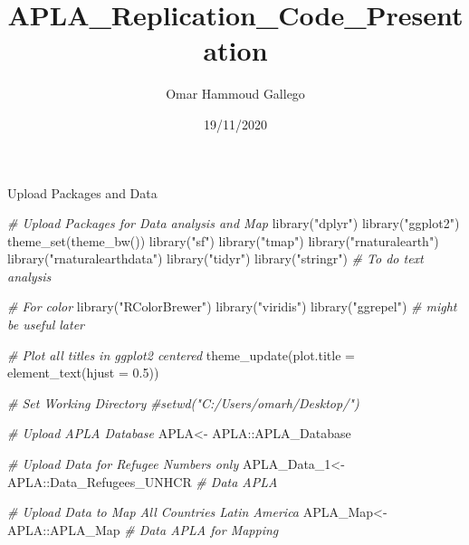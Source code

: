 \documentclass[
  ignorenonframetext,
]{beamer}
\title{APLA\_Replication\_Code\_Presentation}
\author{Omar Hammoud Gallego}
\date{19/11/2020}
\newenvironment{Shaded}{\begin{snugshade}}{\end{snugshade}}
\newcommand{\AttributeTok}[1]{\textcolor[rgb]{0.77,0.63,0.00}{#1}}
\newcommand{\CommentTok}[1]{\textcolor[rgb]{0.56,0.35,0.01}{\textit{#1}}}
\newcommand{\FloatTok}[1]{\textcolor[rgb]{0.00,0.00,0.81}{#1}}
\newcommand{\FunctionTok}[1]{\textcolor[rgb]{0.00,0.00,0.00}{#1}}
\newcommand{\NormalTok}[1]{#1}
\newcommand{\OtherTok}[1]{\textcolor[rgb]{0.56,0.35,0.01}{#1}}
\newcommand{\SpecialCharTok}[1]{\textcolor[rgb]{0.00,0.00,0.00}{#1}}
\newcommand{\StringTok}[1]{\textcolor[rgb]{0.31,0.60,0.02}{#1}}
\begin{document}
\frame{\titlepage}

\begin{frame}[fragile]{Upload Packages and Data}
\protect\hypertarget{upload-packages-and-data}{}
\begin{Shaded}
\begin{Highlighting}[]
\CommentTok{\# Upload Packages for Data analysis and Map}
\FunctionTok{library}\NormalTok{(}\StringTok{"dplyr"}\NormalTok{)}
\FunctionTok{library}\NormalTok{(}\StringTok{"ggplot2"}\NormalTok{)}
\FunctionTok{theme\_set}\NormalTok{(}\FunctionTok{theme\_bw}\NormalTok{())}
\FunctionTok{library}\NormalTok{(}\StringTok{"sf"}\NormalTok{)}
\FunctionTok{library}\NormalTok{(}\StringTok{"tmap"}\NormalTok{)}
\FunctionTok{library}\NormalTok{(}\StringTok{"rnaturalearth"}\NormalTok{)}
\FunctionTok{library}\NormalTok{(}\StringTok{"rnaturalearthdata"}\NormalTok{)}
\FunctionTok{library}\NormalTok{(}\StringTok{"tidyr"}\NormalTok{)}
\FunctionTok{library}\NormalTok{(}\StringTok{"stringr"}\NormalTok{)  }\CommentTok{\# To do text analysis }

\CommentTok{\# For color}
\FunctionTok{library}\NormalTok{(}\StringTok{"RColorBrewer"}\NormalTok{)}
\FunctionTok{library}\NormalTok{(}\StringTok{"viridis"}\NormalTok{)}
\FunctionTok{library}\NormalTok{(}\StringTok{"ggrepel"}\NormalTok{) }\CommentTok{\# might be useful later}

\CommentTok{\# Plot all titles in ggplot2 centered}
\FunctionTok{theme\_update}\NormalTok{(}\AttributeTok{plot.title =} \FunctionTok{element\_text}\NormalTok{(}\AttributeTok{hjust =} \FloatTok{0.5}\NormalTok{))}
\end{Highlighting}
\end{Shaded}

\begin{Shaded}
\begin{Highlighting}[]
\CommentTok{\# Set Working Directory}
\CommentTok{\#setwd("C:/Users/omarh/Desktop/")}

\CommentTok{\# Upload APLA Database}
\NormalTok{APLA}\OtherTok{\textless{}{-}}\NormalTok{ APLA}\SpecialCharTok{::}\NormalTok{APLA\_Database }

\CommentTok{\# Upload Data for Refugee Numbers only}
\NormalTok{APLA\_Data\_1}\OtherTok{\textless{}{-}}\NormalTok{ APLA}\SpecialCharTok{::}\NormalTok{Data\_Refugees\_UNHCR         }\CommentTok{\# Data APLA  }

\CommentTok{\# Upload Data to Map All Countries Latin America}
\NormalTok{APLA\_Map}\OtherTok{\textless{}{-}}\NormalTok{ APLA}\SpecialCharTok{::}\NormalTok{APLA\_Map                      }\CommentTok{\# Data APLA for Mapping }
\end{Highlighting}
\end{Shaded}
\end{frame}
\end{document}
